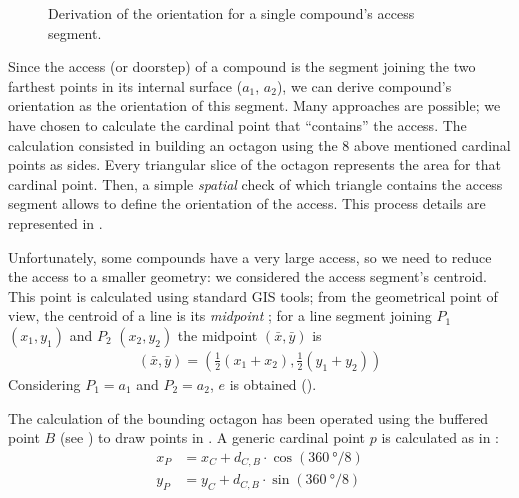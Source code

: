 \begin{wrapfigure}{r}{0.45\textwidth}
                    \caption[Graphical rapresentation of the steps to derive compound's access orientation.]{Derivation of the orientation for a single compound's access segment.%
                    }
                    \label{fig:comp-orient}
                    \vspace{-0.1\textheight}
                \end{wrapfigure}
                Since the access (or doorstep) of a compound is the segment joining the two farthest points in its internal surface ($a_1$, $a_2$), we can derive compound's orientation as the orientation of this segment. Many approaches are possible; we have chosen to calculate the cardinal point that ``contains'' the access. The calculation consisted in building an octagon using the 8 above mentioned cardinal points as sides. Every triangular slice of the octagon represents the area for that cardinal point. Then, a simple \emph{spatial} check of which triangle contains the access segment allows to define the orientation of the access. This process details are represented in .
                
                Unfortunately, some compounds have a very large access, so we need to reduce the access to a smaller geometry: we considered the access segment's centroid. This point is calculated using standard GIS tools; from the geometrical point of view, the centroid of a line is its \emph{midpoint} \cite{calculus-geom}; for a line segment joining $P_1$ $(x_1, y_1)$ and $P_2$ $(x_2, y_2)$ the midpoint $(\bar{x}, \bar{y})$ is
                \begin{align}
                    \label{eq:midpoint}
                    \left(\bar{x}, \bar{y}\right) = \left(\frac{1}{2}\left(x_1 + x_2\right),\frac{1}{2}\left(y_1 + y_2\right)\right)
                \end{align}
                Considering $P_1 = a_1$ and $P_2 = a_2$, $e$ is obtained ().
                
                The calculation of the bounding octagon has been operated using the buffered point $B$ (see ) to draw points in . A generic cardinal point $p$ is calculated as in :
                \begin{align}
                    \label{eq:point-cardinal}
                    x_P &= x_C + d_{C,B}\cdot\cos{(\SI{360}{\degree}/8)}\\
                    y_P &= y_C + d_{C,B}\cdot\sin{(\SI{360}{\degree}/8)}
                \end{align}
                
